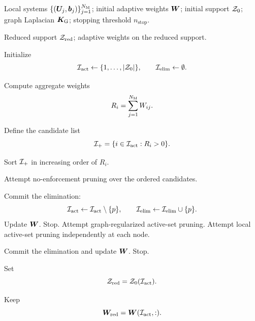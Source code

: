 \documentclass[11pt,a4paper]{article}
\begin{document}
\begin{algorithm}[H]
\caption{MAW--ECM pruning loop}
\label{alg:maw_pruning_loop}
\begin{algorithmic}[1]

\Require
Local systems $\{(\bm U_j,\bm b_j)\}_{j=1}^{N_{\mathrm{M}}}$;
initial adaptive weights $\bm W$;
initial support $\mathcal{Z}_{0}$;
graph Laplacian $\bm K_{\mathrm{G}}$;
stopping threshold $n_{\mathrm{stop}}$.

\Ensure
Reduced support $\mathcal{Z}_{\mathrm{red}}$;
adaptive weights on the reduced support.

\State Initialize
\[
        \mathcal{I}_{\mathrm{act}}\gets\{1,\ldots,|\mathcal{Z}_{0}|\},
        \qquad
        \mathcal{I}_{\mathrm{elim}}\gets\emptyset.
\]


    \State Compute aggregate weights
    \[
        R_i=\sum_{j=1}^{N_{\mathrm{M}}}W_{ij}.
    \]

    \State Define the candidate list
    \[
        \mathcal{I}_{+}=\{i\in\mathcal{I}_{\mathrm{act}}:R_i>0\}.
    \]

    \State Sort $\mathcal{I}_{+}$ in increasing order of $R_i$.

    \State Attempt no-enforcement pruning over the ordered candidates.

        \State Commit the elimination:
        \[
            \mathcal{I}_{\mathrm{act}}\gets\mathcal{I}_{\mathrm{act}}\setminus\{p\},
            \qquad
            \mathcal{I}_{\mathrm{elim}}\gets\mathcal{I}_{\mathrm{elim}}\cup\{p\}.
        \]
        \State Update $\bm W$.
    \Else
            \State Stop.
        \Else
                \State Attempt graph-regularized active-set pruning.
            \Else
                \State Attempt local active-set pruning independently at each node.
            \EndIf

                \State Commit the elimination and update $\bm W$.
            \Else
                \State Stop.
            \EndIf
        \EndIf
    \EndIf

\EndWhile

\State Set
\[
        \mathcal{Z}_{\mathrm{red}}=\mathcal{Z}_{0}(\mathcal{I}_{\mathrm{act}}).
\]

\State Keep
\[
        \bm W_{\mathrm{red}}=\bm W(\mathcal{I}_{\mathrm{act}},:).
\]

\end{algorithmic}
\end{algorithm}

\end{document}
